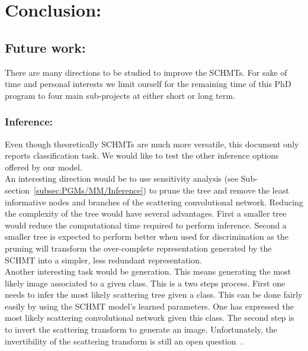 \documentclass[a4paper,11pt]{report}
\begin{document}
\chapter{Conclusion:}
  \label{chap:ccl}

  \section{Future work:}
		\label{sec:Ccl/FutW}
  
		There are many directions to be studied to improve the SCHMTs. For sake of time and personal interests we limit ourself for the remaining time of this PhD program to four main sub-projects at either short or long term.
		
		\subsection{Inference:}
			\label{subsec:Ccl/FutW/Inference}
		
			Even though theoretically SCHMTs are much more versatile, this document only reports classification task. We would like to test the other inference options offered by our model.\\
		
			An interesting direction would be to use sensitivity analysis (see Sub-section~\ref{subsec:PGMs/MM/Inference}) to prune the tree and remove the least informative nodes and branches of the scattering convolutional network. Reducing the complexity of the tree would have several advantages. First a smaller tree would reduce the computational time required to perform inference. Second a smaller tree is expected to perform better when used for discrimination as the pruning will transform the over-complete representation generated by the SCHMT into a simpler, less redundant representation.\\
				
			Another interesting task would be generation. This means generating the most likely image associated to a given class. This is a two steps process. First one needs to infer the most likely scattering tree given a class. This can be done fairly easily by using the SCHMT model's learned parameters. One has expressed the most likely scattering convolutional network given this class. The second step is to invert the scattering transform to generate an image. Unfortunately, the invertibility of the scattering transform is still an open question~\citep{cheng2015deep}.\\
				
\end{document}
